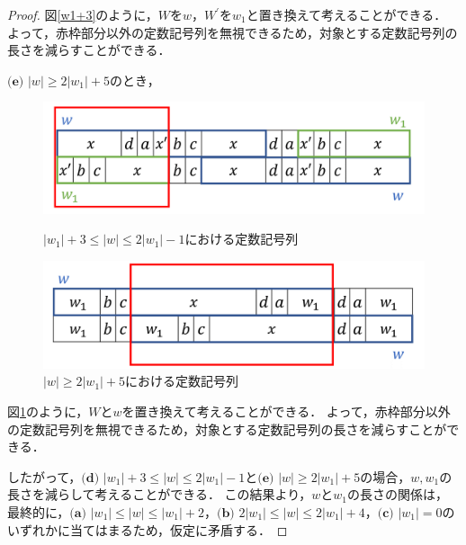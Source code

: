 \begin{proof}

図\ref{w1+3}のように，$W$を$w$，$W^{\prime}$を$w_{1}$と置き換えて考えることができる．
よって，赤枠部分以外の定数記号列を無視できるため，対象とする定数記号列の長さを減らすことができる．

\noindent$\textbf{(e)}$ $|w| \ge 2|w_{1}|+5$のとき，

\begin{figure}
\centering
\includegraphics[width=\linewidth]{figs/w1+3.png}
\vspace{-1cm}
\caption{$|w_{1}|+3 \le |w| \le 2|w_{1}|-1$における定数記号列}
\label{w1+3}

\centering
\includegraphics[width=\linewidth]{figs/2w1+5.png}
\vspace{-1cm}
\caption{$|w| \ge 2|w_{1}|+5$における定数記号列}
\label{2w1+5}
\vspace*{-.3cm}
\end{figure}

図\ref{2w1+5}のように，$W$と$w$を置き換えて考えることができる．
よって，赤枠部分以外の定数記号列を無視できるため，対象とする定数記号列の長さを減らすことができる．

したがって，$\textbf{(d)}$ $|w_{1}|+3 \le |w| \le 2|w_{1}|-1$と$\textbf{(e)}$ $|w| \ge 2|w_{1}|+5$の場合，$w,w_{1}$の長さを減らして考えることができる．
この結果より，$w$と$w_{1}$の長さの関係は，最終的に，$\textbf{(a)}$ $|w_{1}| \le |w| \le |w_{1}|+2$，$\textbf{(b)}$ $2|w_{1}| \le |w| \le 2|w_{1}|+4$，$\textbf{(c)}$ $|w_{1}|=0$のいずれかに当てはまるため，仮定に矛盾する．


\end{proof}
